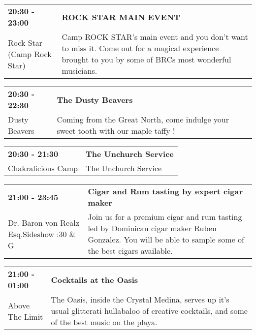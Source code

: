 \begin{tabular}{ p{1in} p{2.2in} }
    \textbf{20:30 - 23:00} & \textbf{ROCK STAR MAIN EVENT} \\
    Rock Star (Camp Rock Star) \newline  & Camp ROCK STAR's main event and you don't want to miss it. Come out for a magical experience brought to you by some of BRCs most wonderful musicians. \\
    \hline 
\end{tabular}
    
\begin{tabular}{ p{1in} p{2.2in} }
    \textbf{20:30 - 22:30} & \textbf{The Dusty Beavers} \\
    Dusty Beavers \newline  & Coming from the Great North, come indulge your sweet tooth with our maple taffy ! \\
    \hline 
\end{tabular}
    
\begin{tabular}{ p{1in} p{2.2in} }
    \textbf{20:30 - 21:30} & \textbf{The Unchurch Service} \\
    Chakralicious Camp \newline  & The Unchurch Service \\
    \hline 
\end{tabular}
    
\begin{tabular}{ p{1in} p{2.2in} }
    \textbf{21:00 - 23:45} & \textbf{Cigar and Rum tasting by expert cigar maker} \\
    Dr. Baron von Realz Esq.Sideshow \newline 4:30 \& G & Join us for a premium cigar and rum tasting led by Dominican cigar maker Ruben Gonzalez. You will be able to sample some of the best cigars available. \\
    \hline 
\end{tabular}
    
\begin{tabular}{ p{1in} p{2.2in} }
    \textbf{21:00 - 01:00} & \textbf{Cocktails at the Oasis} \\
    Above The Limit \newline  & The Oasis, inside the Crystal Medina, serves up it's usual glitterati hullabaloo of creative cocktails, and some of the best music on the playa. \\
    \hline 
\end{tabular}
    
